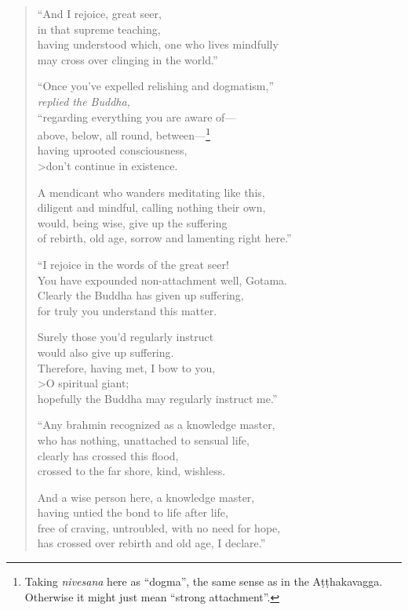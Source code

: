 \documentclass[12pt,openany]{book}%
\newcommand*{\scspeaker}[1]{\hspace{2em}\textit{#1}}
\begin{document}
\begin{verse}
“And I rejoice, great seer, \\
in that supreme teaching, \\
having understood which, one who lives mindfully \\
may cross over clinging in the world.” 

“Once you’ve expelled relishing and dogmatism,” \\
\scspeaker{replied the Buddha, }\\
“regarding everything you are aware of—\\
above, below, all round, between—\footnote{Taking \textit{nivesana} here as “dogma”, the same sense as in the \textsanskrit{Aṭṭhakavagga}. Otherwise it might just mean “strong attachment”. } \\
having uprooted consciousness, \\>don’t continue in existence. 

A mendicant who wanders meditating like this, \\
diligent and mindful, calling nothing their own, \\
would, being wise, give up the suffering \\
of rebirth, old age, sorrow and lamenting right here.” 

“I rejoice in the words of the great seer! \\
You have expounded non-attachment well, Gotama. \\
Clearly the Buddha has given up suffering, \\
for truly you understand this matter. 

Surely those you’d regularly instruct \\
would also give up suffering. \\
Therefore, having met, I bow to you, \\>O spiritual giant; \\
hopefully the Buddha may regularly instruct me.” 

“Any brahmin recognized as a knowledge master, \\
who has nothing, unattached to sensual life, \\
clearly has crossed this flood, \\
crossed to the far shore, kind, wishless. 

And a wise person here, a knowledge master, \\
having untied the bond to life after life, \\
free of craving, untroubled, with no need for hope, \\
has crossed over rebirth and old age, I declare.” 

%
\end{verse}
\end{document}
